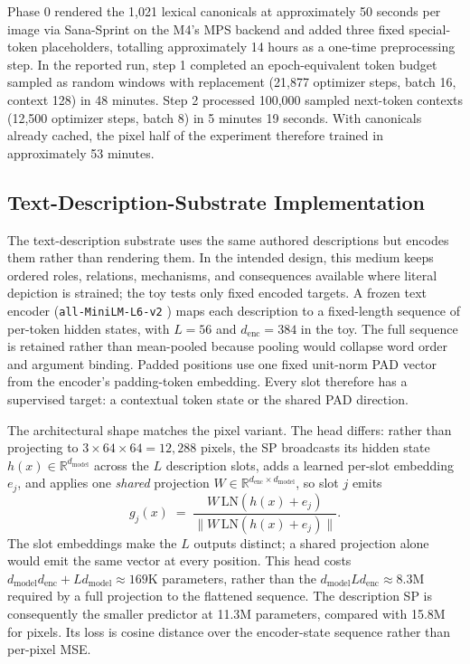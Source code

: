 \documentclass[11pt,a4paper]{article}
\begin{document}
Phase 0 rendered the 1,021 lexical canonicals at approximately 50 seconds per image via Sana-Sprint on the M4's MPS backend and added three fixed special-token placeholders, totalling approximately 14 hours as a one-time preprocessing step. In the reported run, step 1 completed an epoch-equivalent token budget sampled as random windows with replacement (21,877 optimizer steps, batch 16, context 128) in 48 minutes. Step 2 processed 100,000 sampled next-token contexts (12,500 optimizer steps, batch 8) in 5 minutes 19 seconds. With canonicals already cached, the pixel half of the experiment therefore trained in approximately 53 minutes.

\subsection{Text-Description-Substrate Implementation}

The text-description substrate uses the same authored descriptions but encodes them rather than rendering them. In the intended design, this medium keeps ordered roles, relations, mechanisms, and consequences available where literal depiction is strained; the toy tests only fixed encoded targets. A frozen text encoder (\texttt{all-MiniLM-L6-v2} \cite{sbert2019}) maps each description to a fixed-length sequence of per-token hidden states, with $L=56$ and $d_{\text{enc}}=384$ in the toy. The full sequence is retained rather than mean-pooled because pooling would collapse word order and argument binding. Padded positions use one fixed unit-norm PAD vector from the encoder's padding-token embedding. Every slot therefore has a supervised target: a contextual token state or the shared PAD direction.

The architectural shape matches the pixel variant. The head differs: rather than projecting to $3{\times}64{\times}64 = 12{,}288$ pixels, the SP broadcasts its hidden state $h(x) \in \mathbb{R}^{d_{\text{model}}}$ across the $L$ description slots, adds a learned per-slot embedding $e_j$, and applies one \emph{shared} projection $W \in \mathbb{R}^{d_{\text{enc}} \times d_{\text{model}}}$, so slot $j$ emits
\[
  g_j(x) \;=\; \frac{W\,\mathrm{LN}\!\left(h(x) + e_j\right)}{\bigl\lVert W\,\mathrm{LN}\!\left(h(x) + e_j\right)\bigr\rVert}.
\]
The slot embeddings make the $L$ outputs distinct; a shared projection alone would emit the same vector at every position. This head costs $d_{\text{model}}d_{\text{enc}}+Ld_{\text{model}}\approx169$K parameters, rather than the $d_{\text{model}}Ld_{\text{enc}}\approx8.3$M required by a full projection to the flattened sequence. The description SP is consequently the smaller predictor at 11.3M parameters, compared with 15.8M for pixels. Its loss is cosine distance over the encoder-state sequence rather than per-pixel MSE.
\end{document}
